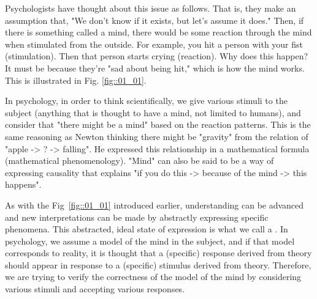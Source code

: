 \documentclass{ltjsbook}
\begin{document}
Psychologists have thought about this issue as follows. That is, they make an assumption that, "We don't know if it exists, but let's assume it does." Then, if there is something called a mind, there would be some reaction through the mind when stimulated from the outside. For example, you hit a person with your fist (stimulation). Then that person starts crying (reaction). Why does this happen? It must be because they're "sad about being hit," which is how the mind works. This is illustrated in Fig. \ref{fig::01_01}.



In psychology, in order to think scientifically, we give various stimuli to the subject (anything that is thought to have a mind, not limited to humans), and consider that "there might be a mind" based on the reaction patterns. This is the same reasoning as Newton thinking there might be "gravity" from the relation of "apple -> ? -> falling". He expressed this relationship in a mathematical formula (mathematical phenomenology). "Mind" can also be said to be a way of expressing causality that explains "if you do this -> because of the mind -> this happens".

As with the Fig~\ref{fig::01_01} introduced earlier, understanding can be advanced and new interpretations can be made by abstractly expressing specific phenomena. This abstracted, ideal state of expression is what we call a . In psychology, we assume a model of the mind in the subject, and if that model corresponds to reality, it is thought that a (specific) response derived from theory should appear in response to a (specific) stimulus derived from theory. Therefore, we are trying to verify the correctness of the model of the mind by considering various stimuli and accepting various responses.
\end{document}
